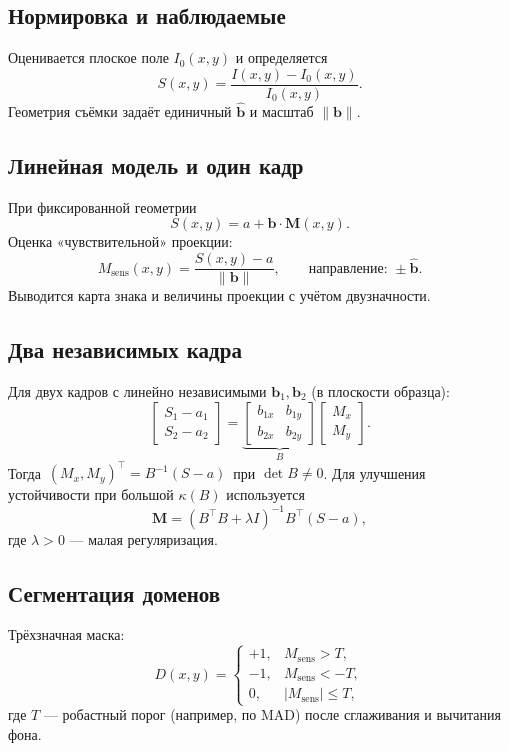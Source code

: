 \documentclass[12pt,a4paper]{article}
\numberwithin{equation}{section}
\begin{document}
\subsection{Нормировка и наблюдаемые}
Оценивается плоское поле \(I_0(x,y)\) и определяется
\begin{equation}
 S(x,y)=\frac{I(x,y)-I_0(x,y)}{I_0(x,y)}.
\end{equation}
Геометрия съёмки задаёт единичный \(\hat{\mathbf b}\) и масштаб \(\|\mathbf b\|\).

\subsection{Линейная модель и один кадр}
При фиксированной геометрии
\begin{equation}
 S(x,y)=a+\mathbf b\cdot \mathbf M(x,y).
\end{equation}
Оценка «чувствительной» проекции:
\begin{equation}
 M_{\text{sens}}(x,y)=\frac{S(x,y)-a}{\|\mathbf b\|}, \qquad \text{направление: } \pm \hat{\mathbf b}.
\end{equation}
Выводится карта знака и величины проекции с учётом двузначности.

\subsection{Два независимых кадра}
Для двух кадров с линейно независимыми \(\mathbf b_1,\mathbf b_2\) (в плоскости образца):
\begin{equation}
 \begin{bmatrix} S_1-a_1\\ S_2-a_2 \end{bmatrix}
 =
 \underbrace{\begin{bmatrix} b_{1x} & b_{1y}\\ b_{2x} & b_{2y}\end{bmatrix}}_{B}
 \begin{bmatrix} M_x\\ M_y \end{bmatrix}.
\end{equation}
Тогда \(\,(M_x,M_y)^\top = B^{-1}(S-a)\,\) при \(\det B\neq 0\). Для улучшения устойчивости при большой \(\kappa(B)\) используется
\begin{equation}
 \mathbf M = (B^\top B + \lambda I)^{-1}B^\top (S-a),
\end{equation}
где \(\lambda>0\) — малая регуляризация.

\subsection{Сегментация доменов}
Трёхзначная маска:
\begin{equation}
 D(x,y)=
 \begin{cases}
 +1, & M_{\text{sens}} > T,\\
 -1, & M_{\text{sens}} < -T,\\
 0, & |M_{\text{sens}}|\le T,
 \end{cases}
\end{equation}
где \(T\) — робастный порог (например, по MAD) после сглаживания и вычитания фона.
\end{document}

